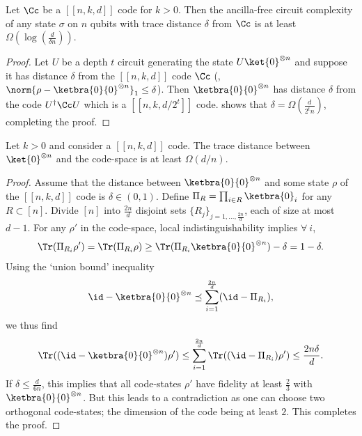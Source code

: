 \documentclass{toc}
\begin{document}
\begin{lemma}
\label{lem:lineardist}
Let $\Cc$ be a $[[n,k,d]]$ code for $k > 0$. Then the ancilla-free circuit complexity of any state $\sigma$ on $n$ qubits with trace distance $\delta$ from $\Cc$ is at least $\Omega(\log (\frac{d}{\delta n}))$.
\end{lemma}

\begin{proof}
Let $U$ be a depth $t$ circuit generating the state $U\ket{0}^{\otimes n}$ and suppose it has distance $\delta$ from the $[[n,k,d]]$ code $\Cc$ (\ie, $\norm{\rho - \ketbra{0}{0}^{\otimes n}}_1 \leq \delta$). Then $\ketbra{0}{0}^{\otimes n}$ has distance $\delta$ from the code $U^\dagger\Cc U$ which is a $[[n,k,d/2^t]]$ code.  shows that $\delta = \Omega \left(\frac{d}{2^t n} \right)$, completing the proof.
\end{proof}

\begin{lemma}
\label{lem:rotatedcodetrdist}
Let $k>0$ and consider a $[[n,k,d]]$ code. The trace distance between $\ket{0}^{\otimes n}$ and the code-space is at least $\Omega(d/n)$.
\end{lemma}


\begin{proof}
Assume that the distance between $\ketbra{0}{0}^{\otimes n}$ and some state $\rho$ of the $[[n,k,d]]$ code is $\delta \in (0,1)$. Define $\Pi_R =  \prod_{i \in R} \ketbra{0}_i$ for any $R\subset [n]$. Divide $[n]$ into $\frac{2n}{d}$ disjoint sets $\{R_j\}_{j=1, \ldots, \frac{2n}{d}}$, each of size at most $d - 1$. For any $\rho'$ in the code-space, local indistinguishability implies $\forall \ i$,
\begin{align}
\Tr(\Pi_{R_i}\rho')=\Tr(\Pi_{R_i}\rho) \geq \Tr(\Pi_{R_i}\ketbra{0}{0}^{\otimes n}) -\delta = 1-\delta.
\end{align}
Using the `union bound' inequality
\begin{align}\id-\ketbra{0}{0}^{\otimes n} \preceq \sum_{i=1}^{\frac{2n}{d}}(\id-\Pi_{R_i}),\end{align}
we thus find
\begin{align}\Tr((\id-\ketbra{0}{0}^{\otimes n})\rho')\leq \sum_{i=1}^{\frac{2n}{d}}\Tr((\id-\Pi_{R_i})\rho') \leq \frac{2n\delta}{d}.\end{align}
If $\delta \leq \frac{d}{6n}$, this implies that all code-states $\rho'$ have fidelity at least $\frac{2}{3}$ with $\ketbra{0}{0}^{\otimes n}$. But this leads to a contradiction as one can choose two orthogonal code-states; the dimension of the code being at least $2$. This completes the proof.
\end{proof}
\end{document}
